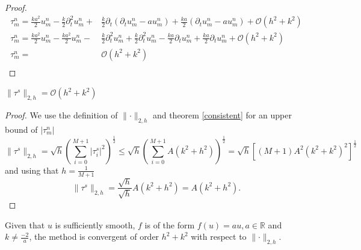 \begin{proof}
    \begin{align*}
        \tau_m^n = \frac{ka^2}{2}u_{m}^{n}  - \frac{k}{2} \partial_t^2 u_{m}^{n} +& \frac{k}{2} \partial_t \left(\partial_t u_{m}^{n}   - au_{m}^{n} \right) + \frac{ka}{2} \left( \partial_t  u_{m}^{n} - a u_{m}^{n}\right)+ \mathcal{O}(h^2 + k^2) \\
        \tau_m^n = \frac{ka^2}{2}u_{m}^{n} - \frac{ka^2}{2}u_{m}^{n}  -& \frac{k}{2} \partial_t^2 u_{m}^{n} + \frac{k}{2} \partial_t^2 u_{m}^{n} - \frac{ka}{2} \partial_t u_{m}^{n} + \frac{ka}{2} \partial_t  u_{m}^{n}+ \mathcal{O}(h^2 + k^2) \\
        \tau_m^n =& \mathcal{O}(h^2 + k^2) \\
    \end{align*}
\end{proof}

\begin{corollary}
    \label{corollary:norm_tau}
    $\lVert\tau^s \lVert_{2, h} =\mathcal{O}(h^2+k^2)$
\end{corollary}

\begin{proof}
We use the definition of $\lVert\cdot\lVert_{2,h}$ and theorem \ref{consistent} for an upper bound of $\lvert \tau_m^n\lvert$
    $$\lVert\tau^s \lVert_{2, h} = \sqrt{h}\left( \sum_{i=0}^{M+1} \lvert\tau^s_i \lvert^2 \right)^\frac{1}{2} \leq \sqrt{h}\left( \sum_{i=0}^{M+1} A(k^2+h^2) \right)^\frac{1}{2} = \sqrt{h}\left[ (M+1) A^2(k^2+k^2)^2 \right]^\frac{1}{2}$$
    and using that $h = \frac{1}{M+1}$
    $$\lVert\tau^s \lVert_{2, h} = \frac{\sqrt{h}}{\sqrt{h}}A(k^2+h^2) = A(k^2+h^2).$$
\end{proof}

\begin{theorem}
  \label{thm:conv_order}
    Given that $u$ is sufficiently smooth,  $f$ is of the form $f(u)=au, a\in \mathbb{R}$ and $k \neq \frac{-2}{a}$, the method is convergent of order $h^2+k^2$ with respect to $\lVert\cdot \lVert_{2, h}$.
\end{theorem}

